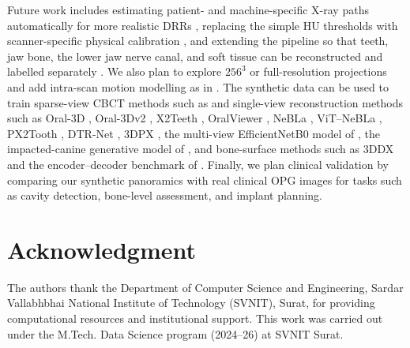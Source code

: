 \documentclass[conference]{IEEEtran}
\begin{document}
Future work includes estimating patient- and machine-specific X-ray paths automatically for more realistic DRRs \cite{park2024nebla,parida2025vit,sunilkumar2025panoramic}, replacing the simple HU thresholds with scanner-specific physical calibration \cite{oliveira2025digital}, and extending the pipeline so that teeth, jaw bone, the lower jaw nerve canal, and soft tissue can be reconstructed and labelled separately \cite{abdi2015automatic,lian2020deep,wang2024neural}. We also plan to explore $256^3$ or full-resolution projections and add intra-scan motion modelling as in \cite{xie2025time,ramesh2024machine}. The synthetic data can be used to train sparse-view CBCT methods such as \cite{lin2023learning,lin2024c,lin2026deepsparse,liu2024geometry,momeni2024differentiable,yang2025trans,zhang2023novel,shin2025sparse} and single-view reconstruction methods such as Oral-3D \cite{song2021oral}, Oral-3Dv2 \cite{song2023oral}, X2Teeth \cite{liang2020x2teeth}, OralViewer \cite{liang2021oralviewer}, NeBLa \cite{park2024nebla}, ViT--NeBLa \cite{parida2025vit}, PX2Tooth \cite{ma2024px2tooth}, DTR-Net \cite{mei2023dtr}, 3DPX \cite{li20243dpx}, the multi-view EfficientNetB0 model of \cite{mohamed20253d}, the impacted-canine generative model of \cite{minhas2024artificial}, and bone-surface methods such as 3DDX \cite{gu20243ddx} and the encoder--decoder benchmark of \cite{shakya2023benchmarking}. Finally, we plan clinical validation by comparing our synthetic panoramics with real clinical OPG images for tasks such as cavity detection, bone-level assessment, and implant planning.

\section*{Acknowledgment}
The authors thank the Department of Computer Science and Engineering, Sardar Vallabhbhai National Institute of Technology (SVNIT), Surat, for providing computational resources and institutional support. This work was carried out under the M.Tech. Data Science program (2024--26) at SVNIT Surat.



\end{document}
